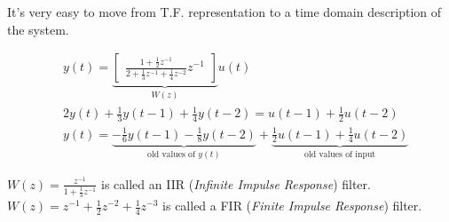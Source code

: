 It's very easy to move from T.F. representation to a time domain description of the system.

\begin{example}
    \begin{align*}
        & y(t) = \underbrace{\begin{bmatrix}
            \frac{1+\frac{1}{2}z^{-1}}{2+\frac{1}{3}z^{-1}+\frac{1}{4}z^{-2}} z^{-1}
        \end{bmatrix}}_{W(z)} u(t) \\
        & 2y(t) + \frac{1}{3}y(t-1) + \frac{1}{4}y(t-2) = u(t-1) + \frac{1}{2}u(t-2) \\
        & y(t) = \underbrace{-\frac{1}{6}y(t-1) - \frac{1}{8}y(t-2)}_\text{old values of $y(t)$} + \underbrace{\frac{1}{2}u(t-1) + \frac{1}{4}u(t-2)}_\text{old values of input}
    \end{align*}

\end{example}
\begin{remark}
    $\displaystyle W(z) = \frac{z^{-1}}{1 + \frac{1}{3}z^{-1}}$ is called an IIR (\emph{Infinite Impulse Response}) filter.\\
    $\displaystyle W(z) = z^{-1} + \frac{1}{2}z^{-2} + \frac{1}{4}z^{-3}$ is called a FIR (\emph{Finite Impulse Response}) filter.
\end{remark}
